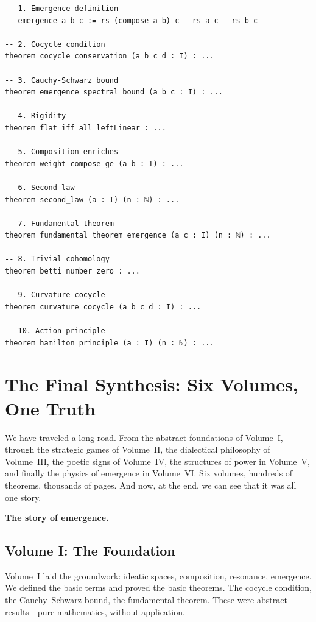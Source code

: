 \begin{lstlisting}[caption={Key theorems summarized (IDT\_v3\_Emergence.lean)}]
-- 1. Emergence definition
-- emergence a b c := rs (compose a b) c - rs a c - rs b c

-- 2. Cocycle condition
theorem cocycle_conservation (a b c d : I) : ...

-- 3. Cauchy-Schwarz bound
theorem emergence_spectral_bound (a b c : I) : ...

-- 4. Rigidity
theorem flat_iff_all_leftLinear : ...

-- 5. Composition enriches
theorem weight_compose_ge (a b : I) : ...

-- 6. Second law
theorem second_law (a : I) (n : ℕ) : ...

-- 7. Fundamental theorem
theorem fundamental_theorem_emergence (a c : I) (n : ℕ) : ...

-- 8. Trivial cohomology
theorem betti_number_zero : ...

-- 9. Curvature cocycle
theorem curvature_cocycle (a b c d : I) : ...

-- 10. Action principle
theorem hamilton_principle (a : I) (n : ℕ) : ...
\end{lstlisting}


\section{The Final Synthesis: Six Volumes, One Truth}

We have traveled a long road. From the abstract foundations of Volume~I,
through the strategic games of Volume~II, the dialectical philosophy of
Volume~III, the poetic signs of Volume~IV, the structures of power in
Volume~V, and finally the physics of emergence in Volume~VI. Six volumes,
hundreds of theorems, thousands of pages. And now, at the end, we can see
that it was all one story.

\textbf{The story of emergence.}

\subsection{Volume I: The Foundation}

Volume~I laid the groundwork: ideatic spaces, composition, resonance, emergence.
We defined the basic terms and proved the basic theorems. The cocycle condition,
the Cauchy--Schwarz bound, the fundamental theorem. These were abstract
results---pure mathematics, without application.

